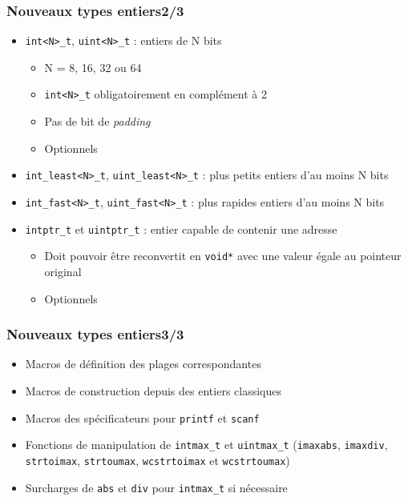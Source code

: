 \documentclass[C++.tex]{subfiles}
\begin{document}
\begin{frame}[fragile]
	\frametitle{Nouveaux types entiers\titlehfill{}2/3}
	\begin{itemize}
		\item \lstinline|int<N>_t|, \lstinline|uint<N>_t| : entiers de N bits
		\begin{itemize}
			\item N = 8, 16, 32 ou 64
			\item \lstinline|int<N>_t| obligatoirement en complément à 2


			\item Pas de bit de \textit{padding}
			\item Optionnels
		\end{itemize}
		\item \lstinline|int_least<N>_t|, \lstinline|uint_least<N>_t| : plus petits entiers d'au moins N bits
		\item \lstinline|int_fast<N>_t|, \lstinline|uint_fast<N>_t| : plus rapides entiers d'au moins N bits
		\item \lstinline|intptr_t| et \lstinline|uintptr_t| : entier capable de contenir une adresse
		\begin{itemize}
			\item Doit pouvoir être reconvertit en \lstinline|void*| avec une valeur égale au pointeur original
			\item Optionnels
		\end{itemize}
	\end{itemize}
\end{frame}

\begin{frame}[fragile]
	\frametitle{Nouveaux types entiers\titlehfill{}3/3}
	\begin{itemize}
		\item Macros de définition des plages correspondantes
		\item Macros de construction depuis des entiers \og classiques\fg{}
		\item Macros des spécificateurs pour \lstinline|printf| et \lstinline|scanf|
		\item Fonctions de manipulation de \lstinline|intmax_t| et \lstinline|uintmax_t| (\lstinline|imaxabs|, \lstinline|imaxdiv|, \lstinline|strtoimax|, \lstinline|strtoumax|, \lstinline|wcstrtoimax| et \lstinline|wcstrtoumax|)
		\item Surcharges de \lstinline|abs| et \lstinline|div| pour \lstinline|intmax_t| si nécessaire
	\end{itemize}
\end{frame}
\end{document}
